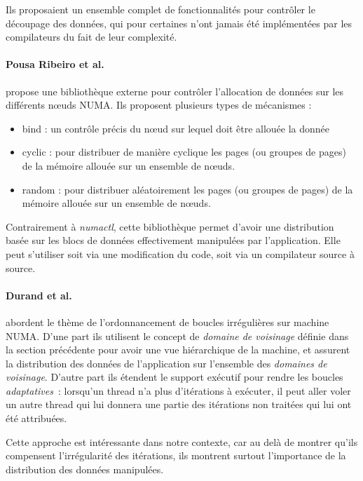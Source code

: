 Ils proposaient un ensemble complet de fonctionnalités pour contrôler le découpage des données, qui pour certaines n'ont jamais été implémentées par les compilateurs du fait de leur complexité.

\paragraph{Pousa Ribeiro et al.~\cite{Pousa2009}} propose une bibliothèque externe pour contrôler l'allocation de données sur les différents nœuds NUMA.
Ils proposent plusieurs types de mécanismes :
\begin{itemize}
  \item bind : un contrôle précis du nœud sur lequel doit être allouée la donnée
  \item cyclic : pour distribuer de manière cyclique les pages (ou groupes de pages) de la mémoire allouée sur un ensemble de nœuds.
  \item random : pour distribuer aléatoirement les pages (ou groupes de pages) de la mémoire allouée sur un ensemble de nœuds.
\end{itemize}

Contrairement à \emph{numactl}, cette bibliothèque permet d'avoir une distribution basée sur les blocs de données effectivement manipulées par l'application.
Elle peut s'utiliser soit via une modification du code, soit via un compilateur source à source.



\paragraph{Durand et al.~\cite{Durand2013}} abordent le thème de l'ordonnancement de boucles irrégulières sur machine NUMA.
D'une part ils utilisent le concept de \emph{domaine de voisinage} définie dans la section précédente pour avoir une vue hiérarchique de la machine, et assurent la distribution des données de l'application sur l'ensemble des \emph{domaines de voisinage}.
D'autre part ils étendent le support exécutif pour rendre les boucles \emph{adaptatives}~: lorsqu'un thread n'a plus d'itérations à exécuter, il peut aller voler un autre thread qui lui donnera une partie des itérations non traitées qui lui ont été attribuées.

Cette approche est intéressante dans notre contexte, car au delà de montrer qu'ils compensent l'irrégularité des itérations, ils montrent surtout l'importance de la distribution des données manipulées.


